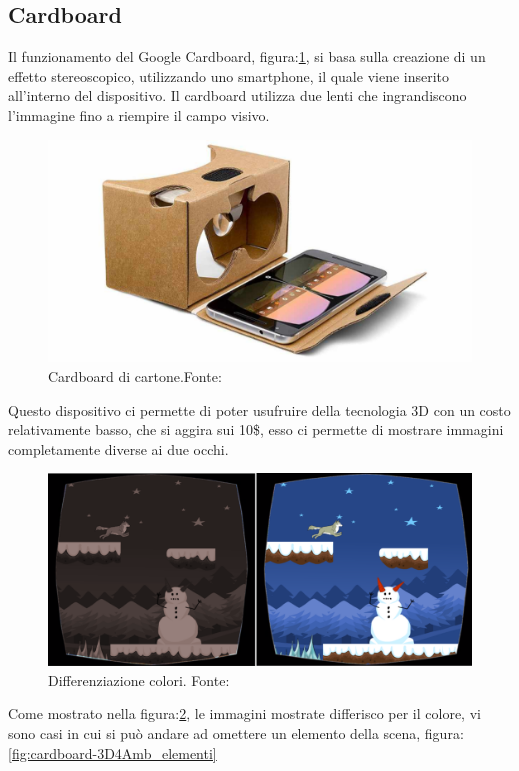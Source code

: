 \documentclass[
a4paper,
cleardoublepage=empty,
headings=twolinechapter,
numbers=autoenddot,
]{scrbook}
\begin{document}
	\subsection{Cardboard}\label{chap:cardboard}
	Il funzionamento del Google Cardboard, figura:\ref{fig:cardboard}, si basa sulla creazione di un effetto stereoscopico\cite{Stereoscopio}, utilizzando uno smartphone, il quale viene inserito all'interno del dispositivo.
	Il cardboard utilizza due lenti che ingrandiscono l'immagine fino a riempire il campo visivo\cite{Funzionamento_cardboard}.
	\begin{figure}[H]
		\centering
		\includegraphics[width=0.8\linewidth]{image/cardboard}
		\caption{Cardboard di cartone.Fonte:\cite{Cardboard_image}}
		\label{fig:cardboard}
	\end{figure}
	Questo dispositivo ci permette di poter usufruire della tecnologia 3D con un costo relativamente basso, che si aggira sui 10\$, esso ci permette di mostrare immagini completamente diverse ai due occhi.
	\begin{figure}[H]
		\centering
		\includegraphics[width=0.8\linewidth]{image/3D4Amb_1}
		\caption{Differenziazione colori.
			Fonte:\cite{3d4amb}}
		\label{fig:cardboard-3D4Amb_colori}
	\end{figure}
	Come mostrato nella figura:\ref{fig:cardboard-3D4Amb_colori}, le immagini mostrate differisco per il colore, vi sono casi in cui si può andare ad omettere un elemento della scena, figura:\ref{fig:cardboard-3D4Amb_elementi}
\end{document}
